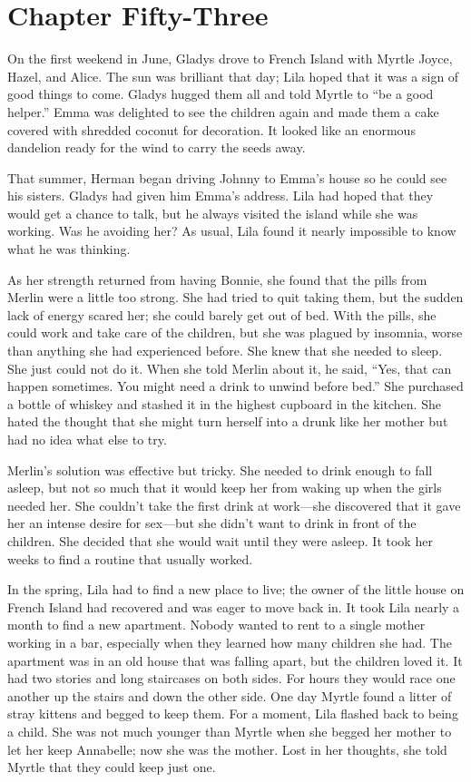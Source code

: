 \documentclass[
  american,
  letterpaper,
]{book}
\begin{document}

\chapter{Chapter Fifty-Three}\label{chapter-fifty-three}

On the first weekend in June, Gladys drove to French Island with Myrtle
Joyce, Hazel, and Alice. The sun was brilliant that day; Lila hoped that
it was a sign of good things to come. Gladys hugged them all and told
Myrtle to ``be a good helper.'' Emma was delighted to see the children
again and made them a cake covered with shredded coconut for decoration.
It looked like an enormous dandelion ready for the wind to carry the
seeds away.

That summer, Herman began driving Johnny to Emma's house so he could see
his sisters. Gladys had given him Emma's address. Lila had hoped that
they would get a chance to talk, but he always visited the island while
she was working. Was he avoiding her? As usual, Lila found it nearly
impossible to know what he was thinking.

As her strength returned from having Bonnie, she found that the pills
from Merlin were a little too strong. She had tried to quit taking them,
but the sudden lack of energy scared her; she could barely get out of
bed. With the pills, she could work and take care of the children, but
she was plagued by insomnia, worse than anything she had experienced
before. She knew that she needed to sleep. She just could not do it.
When she told Merlin about it, he said, ``Yes, that can happen
sometimes. You might need a drink to unwind before bed.'' She purchased
a bottle of whiskey and stashed it in the highest cupboard in the
kitchen. She hated the thought that she might turn herself into a drunk
like her mother but had no idea what else to try.

Merlin's solution was effective but tricky. She needed to drink enough
to fall asleep, but not so much that it would keep her from waking up
when the girls needed her. She couldn't take the first drink at
work---she discovered that it gave her an intense desire for sex---but
she didn't want to drink in front of the children. She decided that she
would wait until they were asleep. It took her weeks to find a routine
that usually worked.

In the spring, Lila had to find a new place to live; the owner of the
little house on French Island had recovered and was eager to move back
in. It took Lila nearly a month to find a new apartment. Nobody wanted
to rent to a single mother working in a bar, especially when they
learned how many children she had. The apartment was in an old house
that was falling apart, but the children loved it. It had two stories
and long staircases on both sides. For hours they would race one another
up the stairs and down the other side. One day Myrtle found a litter of
stray kittens and begged to keep them. For a moment, Lila flashed back
to being a child. She was not much younger than Myrtle when she begged
her mother to let her keep Annabelle; now she was the mother. Lost in
her thoughts, she told Myrtle that they could keep just one.
\end{document}
